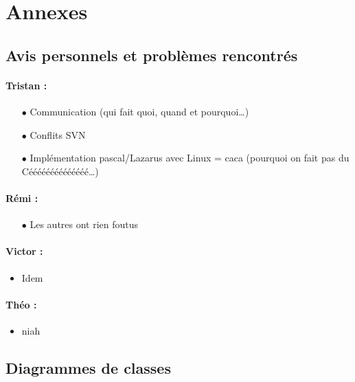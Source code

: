 \section{Annexes}
\subsection{Avis personnels et problèmes rencontrés}
\paragraph{Tristan :}
\begin{itemize}
\item[$\bullet$]Communication (qui fait quoi, quand et pourquoi\dots )
\item[$\bullet$]Conflits SVN
\item[$\bullet$]Implémentation pascal/Lazarus avec Linux = caca
(pourquoi on fait pas du Céééééééééééééé\dots)
\end{itemize}
\paragraph{Rémi :}
\begin{itemize}
\item[$\bullet$] Les autres ont rien foutus
\end{itemize}
\paragraph{Victor :}
\begin{itemize}
\item Idem
\end{itemize}

\paragraph{Théo :}
\begin{itemize}
\item niah
\end{itemize}

\newpage
\subsection{Diagrammes de classes}

